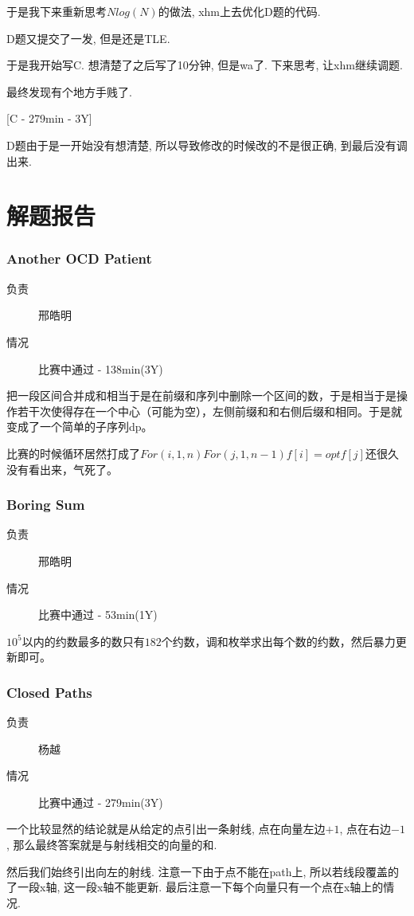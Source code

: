 \documentclass[a4paper, 11pt, nofonts, nocap, fancyhdr]{ctexart}
\newcommand{\problem}[1]{\subsubsection{#1}}
\begin{document}
于是我下来重新思考$Nlog(N)$的做法, xhm上去优化D题的代码.

D题又提交了一发, 但是还是TLE.

于是我开始写C. 想清楚了之后写了10分钟, 但是wa了. 下来思考, 让xhm继续调题.

最终发现有个地方手贱了.

[C - 279min - 3Y]

D题由于是一开始没有想清楚, 所以导致修改的时候改的不是很正确, 到最后没有调出来.

\section{解题报告}

\problem{Another OCD Patient}

\begin{description}
\item[负责] 邢皓明
\item[情况] 比赛中通过 - 138min(3Y)
\end{description}

把一段区间合并成和相当于是在前缀和序列中删除一个区间的数，于是相当于是操作若干次使得存在一个中心（可能为空），左侧前缀和和右侧后缀和相同。于是就变成了一个简单的子序列dp。

比赛的时候循环居然打成了$For(i,1,n) For(j,1,n-1) f[i] = opt{f[j]}$还很久没有看出来，气死了。

\problem{Boring Sum}

\begin{description}
\item[负责] 邢皓明
\item[情况] 比赛中通过 - 53min(1Y)
\end{description}

$10^5$以内的约数最多的数只有$182$个约数，调和枚举求出每个数的约数，然后暴力更新即可。

\problem{Closed Paths}

\begin{description}
\item[负责] 杨越
\item[情况] 比赛中通过 - 279min(3Y)
\end{description}

一个比较显然的结论就是从给定的点引出一条射线, 点在向量左边$+1$, 点在右边$-1$, 那么最终答案就是与射线相交的向量的和.

然后我们始终引出向左的射线. 注意一下由于点不能在path上, 所以若线段覆盖的了一段x轴, 这一段x轴不能更新. 最后注意一下每个向量只有一个点在x轴上的情况.
\end{document}

